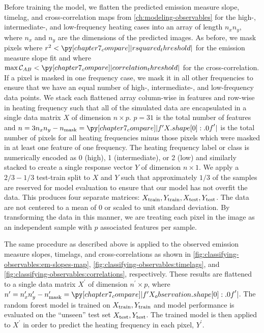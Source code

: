 Before training the model, we flatten the predicted emission measure slope, timelag, and cross-correlation maps from \autoref{ch:modeling-observables} for the high-, intermediate-, and low-frequency heating cases into an array of length $n_xn_y$, where $n_x$ and $n_y$ are the dimensions of the predicted images. As before, we mask pixels where $r^2<\py[chapter7_compare]|rsquared_threshold|$ for the emission measure slope fit and where $\max\mathcal{C}_{AB}<\py[chapter7_compare]|correlation_threshold|$ for the cross-correlation. If a pixel is masked in one frequency case, we mask it in all other frequencies to ensure that we have an equal number of high-, intermediate-, and low-frequency data points. We stack each flattened array column-wise in features and row-wise in heating frequency such that all of the simulated data are encapsulated in a single data matrix $X$ of dimension $n\times p$. $p=31$ is the total number of features and $n=3n_xn_y - n_\textup{mask}=\py[chapter7_compare]|f'{X.shape[0]:.0f}'|$ is the total number of pixels for all heating frequencies minus those pixels which were masked in at least one feature of one frequency. The heating frequency label or class is numerically encoded as 0 (high), 1 (intermediate), or 2 (low) and similarly stacked to create a single response vector $Y$ of dimension $n\times1$. We apply a $2/3-1/3$ test-train split to $X$ and $Y$ such that approximately $1/3$ of the samples are reserved for model evaluation to ensure that our model has not overfit the data. This produces four separate matrices: $X_\textup{train},Y_\textup{train},X_\textup{test},Y_\textup{test}$. The data are not centered to a mean of 0 or scaled to unit standard deviation. By transforming the data in this manner, we are treating each pixel in the image as an independent sample with $p$ associated features per sample.

The same procedure as described above is applied to the observed emission measure slopes, timelags, and cross-correlations as shown in \autoref{fig:classifying-observables:em-slopes-map}, \autoref{fig:classifying-observables:timelags}, and \autoref{fig:classifying-observables:correlations}, respectively. These results are flattened to a single data matrix $X^\prime$ of dimension $n^\prime\times p$, where $n^\prime=n_x^\prime n_y^\prime - n^\prime_\textup{mask}=\py[chapter7_compare]|f'{X_observation.shape[0]:.0f}'|$. The random forest model is trained on $X_\textup{train},Y_\textup{train}$ and model performance is evaluated on the ``unseen'' test set $X_\textup{test},Y_\textup{test}$. The trained model is then applied to $X^\prime$ in order to predict the heating frequency in each pixel, $Y^\prime$.

